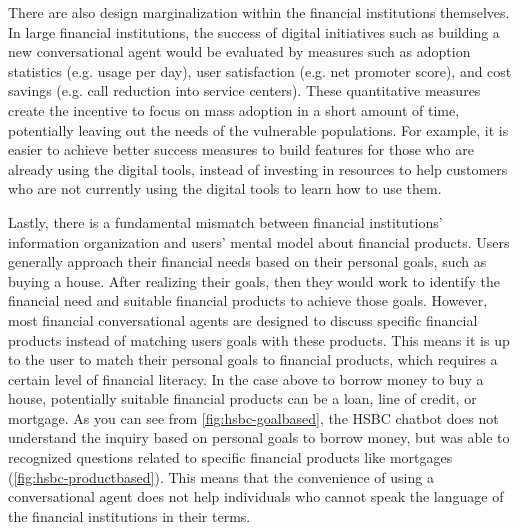 There are also design marginalization within the financial institutions themselves. In large financial institutions, the success of digital initiatives such as building a new conversational agent would be evaluated by measures such as adoption statistics (e.g. usage per day), user satisfaction (e.g. net promoter score), and cost savings (e.g. call reduction into service centers). These quantitative measures create the incentive to focus on mass adoption in a short amount of time, potentially leaving out the needs of the vulnerable populations. For example, it is easier to achieve better success measures to build features for those who are already using the digital tools, instead of investing in resources to help customers who are not currently using the digital tools to learn how to use them.

Lastly, there is a fundamental mismatch between financial institutions' information organization and users' mental model about financial products. Users generally approach their financial needs based on their personal goals, such as buying a house. After realizing their goals, then they would work to identify the financial need and suitable financial products to achieve those goals. However, most financial conversational agents are designed to discuss specific financial products instead of matching users goals with these products. This means it is up to the user to match their personal goals to financial products, which requires a certain level of financial literacy. In the case above to borrow money to buy a house, potentially suitable financial products can be a loan, line of credit, or mortgage. As you can see from \autoref{fig:hsbc-goalbased}, the HSBC chatbot does not understand the inquiry based on personal goals to borrow money, but was able to recognized questions related to specific financial products like mortgages (\autoref{fig:hsbc-productbased}). This means that the convenience of using a conversational agent does not help individuals who cannot speak the language of the financial institutions in their terms. %





